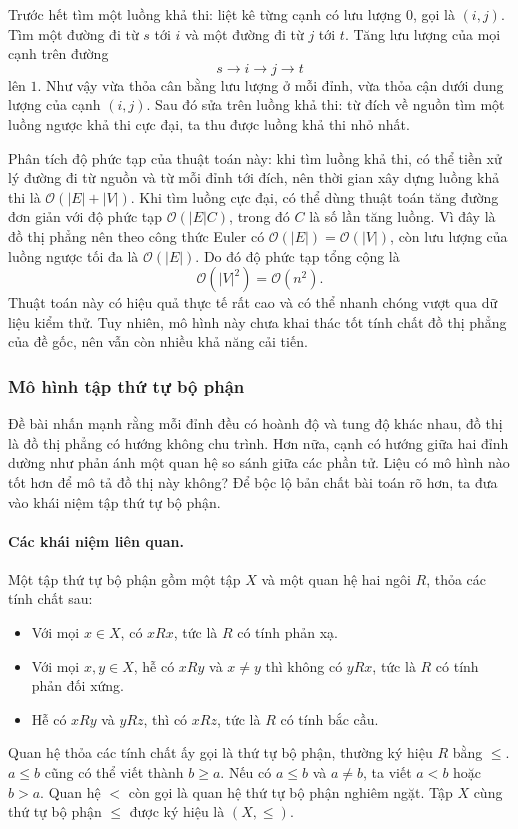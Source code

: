 \documentclass[11pt]{article}
\newcommand{\Oh}{\mathcal{O}}
\begin{document}
Trước hết tìm một luồng khả thi: liệt kê từng cạnh có lưu lượng \(0\), gọi là
\((i,j)\). Tìm một đường đi từ \(s\) tới \(i\) và một đường đi từ \(j\) tới
\(t\). Tăng lưu lượng của mọi cạnh trên đường
\[
  s \to i \to j \to t
\]
lên \(1\). Như vậy vừa thỏa cân bằng lưu lượng ở mỗi đỉnh, vừa thỏa cận dưới
dung lượng của cạnh \((i,j)\). Sau đó sửa trên luồng khả thi: từ đích về nguồn
tìm một luồng ngược khả thi cực đại, ta thu được luồng khả thi nhỏ nhất.

Phân tích độ phức tạp của thuật toán này: khi tìm luồng khả thi, có thể tiền
xử lý đường đi từ nguồn và từ mỗi đỉnh tới đích, nên thời gian xây dựng luồng
khả thi là \(\Oh(|E|+|V|)\). Khi tìm luồng cực đại, có thể dùng thuật toán tăng
đường đơn giản với độ phức tạp \(\Oh(|E|C)\), trong đó \(C\) là số lần tăng
luồng. Vì đây là đồ thị phẳng nên theo công thức Euler có
\(\Oh(|E|)=\Oh(|V|)\), còn lưu lượng của luồng ngược tối đa là \(\Oh(|E|)\).
Do đó độ phức tạp tổng cộng là
\[
  \Oh(|V|^2)=\Oh(n^2).
\]
Thuật toán này có hiệu quả thực tế rất cao và có thể nhanh chóng vượt qua dữ
liệu kiểm thử. Tuy nhiên, mô hình này chưa khai thác tốt tính chất đồ thị
phẳng của đề gốc, nên vẫn còn nhiều khả năng cải tiến.

\subsubsection{Mô hình tập thứ tự bộ phận}

Đề bài nhấn mạnh rằng mỗi đỉnh đều có hoành độ và tung độ khác nhau, đồ thị là
đồ thị phẳng có hướng không chu trình. Hơn nữa, cạnh có hướng giữa hai đỉnh
dường như phản ánh một quan hệ so sánh giữa các phần tử. Liệu có mô hình nào
tốt hơn để mô tả đồ thị này không? Để bộc lộ bản chất bài toán rõ hơn, ta đưa
vào khái niệm tập thứ tự bộ phận.

\paragraph{Các khái niệm liên quan.}
Một tập thứ tự bộ phận gồm một tập \(X\) và một quan hệ hai ngôi \(R\), thỏa
các tính chất sau:
\begin{itemize}
  \item Với mọi \(x\in X\), có \(xRx\), tức là \(R\) có tính phản xạ.
  \item Với mọi \(x,y\in X\), hễ có \(xRy\) và \(x\ne y\) thì không có
  \(yRx\), tức là \(R\) có tính phản đối xứng.
  \item Hễ có \(xRy\) và \(yRz\), thì có \(xRz\), tức là \(R\) có tính bắc cầu.
\end{itemize}
Quan hệ thỏa các tính chất ấy gọi là thứ tự bộ phận, thường ký hiệu \(R\) bằng
\(\le\). \(a\le b\) cũng có thể viết thành \(b\ge a\). Nếu có \(a\le b\) và
\(a\ne b\), ta viết \(a<b\) hoặc \(b>a\). Quan hệ \(<\) còn gọi là quan hệ thứ
tự bộ phận nghiêm ngặt. Tập \(X\) cùng thứ tự bộ phận \(\le\) được ký hiệu là
\((X,\le)\).
\end{document}
